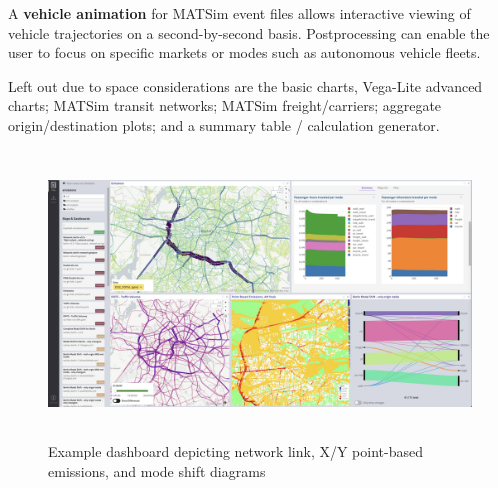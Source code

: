 \documentclass[3p,times,procedia]{elsarticle}
\begin{document}
A \textbf{vehicle animation} for MATSim event files allows interactive viewing of vehicle trajectories on a second-by-second basis. Postprocessing can enable the user to focus on specific markets or modes such as autonomous vehicle fleets.

Left out due to space considerations are the basic charts, Vega-Lite\cite{VegaLiteWebsite}  advanced charts; MATSim transit networks; MATSim freight/carriers; aggregate origin/destination plots; and a summary table / calculation generator.

\begin{figure}
  \centering
  \includegraphics[width=\textwidth,height=3in]{images/fig-dashboard-2.jpg}
  \caption{Example dashboard depicting network link, X/Y point-based emissions, and mode shift diagrams}
  \label{fig:chart2}
\end{figure}





\end{document}
